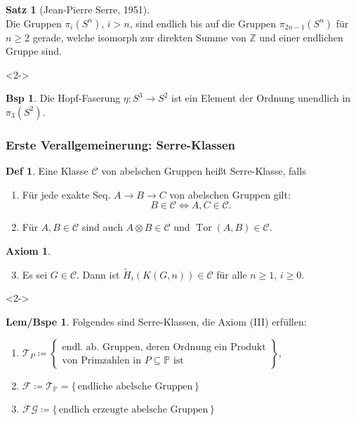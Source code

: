 \documentclass{beamer}
\newcommand{\Z}{\mathbb{Z}} %
\newcommand{\SC}{\mathcal{C}} %
\newcommand{\FG}{\mathcal{FG}} %
\newcommand{\T}{\mathcal{T}} %
\newcommand{\F}{\mathcal{F}} %
\DeclareMathOperator{\Tor}{Tor} %
\newcommand{\Primes}{\mathbb{P}} %
\theoremstyle{definition}
\newtheorem*{defn}{Def} %
\newtheorem*{satz}{Satz}
\newtheorem*{bsp}{Bsp} %
\newtheorem*{axiom}{Axiom}
\newtheorem*{lembspe}{Lem/Bspe} %
\renewcommand{\emph}[1]{\textcolor{Emph}{#1}}
\begin{document}
\begin{frame}
  \begin{satz}[Jean-Pierre Serre, 1951] \mbox{} \\
    Die Gruppen $\pi_i(S^n)$, $i > n$, sind endlich bis auf die Gruppen $\pi_{2n-1}(S^n)$ für $n \geq 2$ gerade, welche isomorph zur direkten Summe von $\Z$ und einer endlichen Gruppe sind.
  \end{satz}
  
  \begin{visibleenv}<2->
  \begin{bsp}
    Die Hopf-Faserung $\eta : S^3 \to S^2$ ist ein Element der Ordnung unendlich in $\pi_3(S^2)$.
  \end{bsp}
  \end{visibleenv}
\end{frame}

\begin{frame}
  \frametitle{Erste Verallgemeinerung: Serre-Klassen}
  \begin{defn}
    Eine Klasse $\SC$ von abelschen Gruppen heißt \emph{Serre-Klasse}, falls
    \begin{enumerate}[label=(\Roman*)]
      \item Für jede exakte Seq. $A \to B \to C$ von abelschen Gruppen gilt:
      \[
        B \in \SC \iff A, C \in \SC.
      \]
      \item Für $A, B \in \SC$ sind auch $A \otimes B \in \SC$ und $\Tor(A, B) \in \SC$.
    \end{enumerate}
  \end{defn}
  \begin{axiom} \mbox{} \\
    \begin{enumerate}[label=(\Roman*)]
      \setcounter{enumi}{2}
      \item Es sei $G \in \SC$.
      Dann ist $\widetilde{H}_i(K(G, n)) \in \SC$ für alle $n \geq 1$, $i \geq 0$.
    \end{enumerate}
  \end{axiom}

  \begin{visibleenv}<2->
  \begin{lembspe}
    Folgendes sind Serre-Klassen, die Axiom (III) erfüllen:
    \begin{enumerate}[label=\alph*)]
      \item $\T_P \coloneqq \left\{ \begin{array}{l}
        \text{endl. ab. Gruppen, deren Ordnung ein Produkt} \\
        \text{von Primzahlen in $P \subseteq \Primes$ ist}
      \end{array} \right\}$,
      \item $\F \coloneqq \T_\Primes = \{\, \text{endliche abelsche Gruppen} \,\}$
      \item $\FG \coloneqq \{\, \text{endlich erzeugte abelsche Gruppen} \,\}$
    \end{enumerate}
  \end{lembspe}
  \end{visibleenv}
\end{frame}
\end{document}
